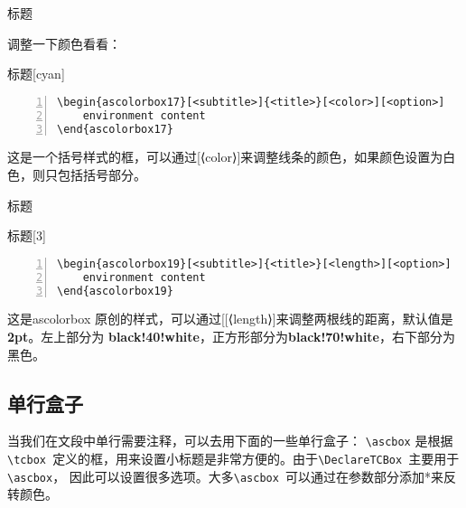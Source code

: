 \documentclass[a4]{ctexart}
\newcommand{\md}[1]{{\color{purple}#1}}
\begin{document}
\begin{ascolorbox17}[子标题]{标题}
    \zhlipsum[1]
\end{ascolorbox17}
调整一下颜色看看：
\begin{ascolorbox17}[子标题]{标题}[cyan]
    \zhlipsum[1]
\end{ascolorbox17}
\begin{lstlisting}[backgroundcolor=\color{gray!5},framerule=1pt,frame=tb,numbers=left,
    numberstyle=\tiny\color{black},]
\begin{ascolorbox17}[<subtitle>]{<title>}[<color>][<option>]
    environment content
\end{ascolorbox17}
\end{lstlisting}
这是一个括号样式的框，可以通过\md{[⟨color⟩]}来调整线条的颜色，如果颜色设置为白色，则只包括括号部分。

\begin{ascolorbox19}[子标题]{标题}
    \zhlipsum[1]
\end{ascolorbox19}

\begin{ascolorbox19}[子标题]{标题}[3]
    \zhlipsum[1]
\end{ascolorbox19}

\begin{lstlisting}[backgroundcolor=\color{gray!5},framerule=1pt,frame=tb,numbers=left,
    numberstyle=\tiny\color{black},]
\begin{ascolorbox19}[<subtitle>]{<title>}[<length>][<option>]
    environment content
\end{ascolorbox19}
\end{lstlisting}
这是ascolorbox 原创的样式，可以通过[\md{[⟨length⟩]}来调整两根线的距离，默认值是\textbf{2pt}。左上部分为
\textbf{black!40!white}，正方形部分为\textbf{black!70!white}，右下部分为黑色。


\subsection{单行盒子}
当我们在文段中单行需要注释，可以去用下面的一些单行盒子：
\verb|\ascbox| 是根据\verb|\tcbox |定义的框，用来设置小标题是非常方便的。由于\verb|\DeclareTCBox |主要用于\verb|\ascbox|，
因此可以设置很多选项。大多\verb|\ascbox |可以通过在参数部分添加*来反转颜色。

\begin{mylisting}
    
\end{mylisting}
\end{document}
